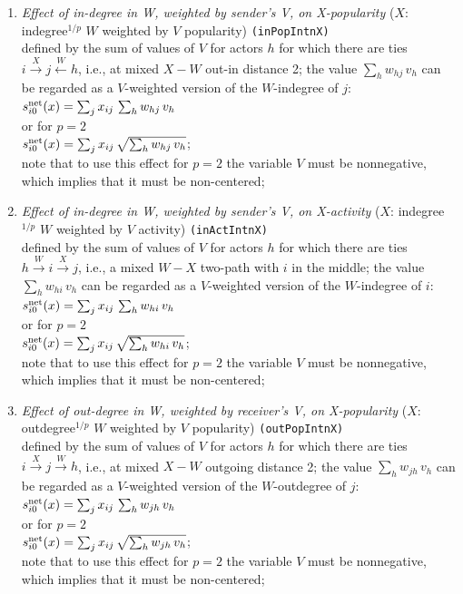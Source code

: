 \documentclass[a4paper,fleqn,11pt]{article}
\newcommand{\+}{\, + \,}
\newcommand{\vit}{\theenumi}
\newcounter{savenumi}
\begin{document}
\begin{enumerate}
\setcounter{enumi}{\value{savenumi}}
 \item {\em Effect of in-degree in W, weighted by sender's V, on X-popularity }
 ($X$: indegree$^{1/p}$ $W$ weighted by $V$ popularity)   \texttt{(inPopIntnX)}\\
 defined by the sum of values of $V$ for actors $h$
 for which there are ties  $ i \stackrel{X}{\rightarrow} j \stackrel{W}{\leftarrow} h$,
 i.e., at mixed $X - W$ out-in  distance 2;
 the value $\sum_h w_{hj}\,v_h$ can be regarded as a $V$-weighted
 version of the $W$-indegree of $j$:\\
 $s^{\rm net}_{i\vit}(x) =  \sum_j x_{ij}\, \sum_h w_{hj}\,v_h  $ \\
 or for $p=2$ \\
   $s^{\rm net}_{i\vit}(x) =  \sum_j x_{ij}\, \sqrt{\sum_h w_{hj}\,v_h}   $;\\
 note that to use this effect for $p=2$ the variable $V$ must be nonnegative,
 which implies that it must be non-centered;

 \item {\em Effect of in-degree in W, weighted by sender's V, on X-activity }
 ($X$: indegree$^{1/p}$ $W$ weighted by $V$ activity)   \texttt{(inActIntnX)}\\
 defined by the sum of values of $V$ for actors $h$
 for which there are ties  $h \stackrel{W}{\rightarrow} i \stackrel{X}{\rightarrow} j$,
 i.e., a mixed $W - X$ two-path with $i$ in the middle;
 the value $\sum_h w_{hi}\,v_h$ can be regarded as a $V$-weighted
 version of the $W$-indegree of $i$:\\
 $s^{\rm net}_{i\vit}(x) =  \sum_j x_{ij}\, \sum_h w_{hi}\,v_h  $ \\
 or for $p=2$ \\
   $s^{\rm net}_{i\vit}(x) =  \sum_j x_{ij}\, \sqrt{\sum_h w_{hi}\,v_h}   $;\\
 note that to use this effect for $p=2$ the variable $V$ must be nonnegative,
 which implies that it must be non-centered;


 \item {\em Effect of out-degree in W, weighted by receiver's V, on X-popularity }
 ($X$: outdegree$^{1/p}$ $W$ weighted by $V$ popularity)   \texttt{(outPopIntnX)}\\
 defined by the sum of values of $V$ for actors $h$
 for which there are ties  $ i \stackrel{X}{\rightarrow} j \stackrel{W}{\rightarrow} h$,
 i.e., at mixed $X - W$ outgoing  distance 2;
 the value $\sum_h w_{jh}\,v_h$ can be regarded as a $V$-weighted
 version of the $W$-outdegree of $j$:\\
 $s^{\rm net}_{i\vit}(x) =  \sum_j x_{ij}\, \sum_h w_{jh}\,v_h  $ \\
 or for $p=2$ \\
   $s^{\rm net}_{i\vit}(x) =  \sum_j x_{ij}\, \sqrt{\sum_h w_{jh}\,v_h}   $;\\
 note that to use this effect for $p=2$ the variable $V$ must be nonnegative,
 which implies that it must be non-centered;


\end{enumerate}
\end{document}
